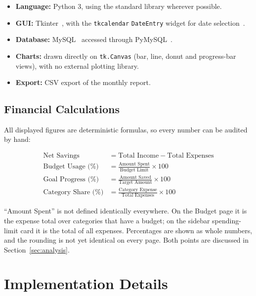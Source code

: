 \documentclass{tietreport}
\begin{document}
\begin{itemize}
  \item \textbf{Language:} Python 3, using the standard library
    wherever possible.
  \item \textbf{GUI:} Tkinter~\cite{pythontkinter}, with the
    \texttt{tkcalendar} \texttt{DateEntry} widget for date
    selection~\cite{tkcalendardocs}.
  \item \textbf{Database:} MySQL~\cite{mysqlmanual} accessed
    through PyMySQL~\cite{pymysqldocs}.
  \item \textbf{Charts:} drawn directly on \texttt{tk.Canvas}
    (bar, line, donut and progress-bar views), with no external
    plotting library.
  \item \textbf{Export:} CSV export of the monthly report.
\end{itemize}

\subsection{Financial Calculations}

All displayed figures are deterministic formulas, so every number
can be audited by hand:

\begin{align*}
  \text{Net Savings} &= \text{Total Income} - \text{Total Expenses}\\
  \text{Budget Usage (\%)} &= \frac{\text{Amount Spent}}{\text{Budget Limit}} \times 100\\
  \text{Goal Progress (\%)} &= \frac{\text{Amount Saved}}{\text{Target Amount}} \times 100\\
  \text{Category Share (\%)} &= \frac{\text{Category Expense}}{\text{Total Expenses}} \times 100
\end{align*}

``Amount Spent'' is not defined identically everywhere. On the
Budget page it is the expense total over categories that have a
budget; on the sidebar spending-limit card it is the total of all
expenses. Percentages are shown as whole numbers, and the rounding
is not yet identical on every page. Both points are discussed in
Section~\ref{sec:analysis}.


\section{Implementation Details}
\end{document}
